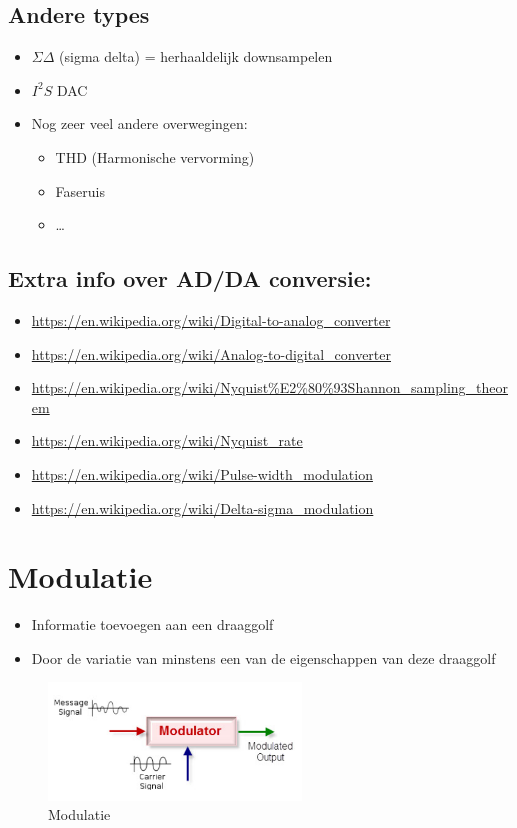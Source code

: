 \documentclass{article}
\begin{document}
\subsection{Andere types}
\begin{itemize}
    \item $\Sigma\Delta$ (sigma delta) = herhaaldelijk downsampelen
    \item $I^2S$ DAC
    \item Nog zeer veel andere overwegingen:
    \begin{itemize}
        \item THD (Harmonische vervorming)
        \item Faseruis
        \item \dots
    \end{itemize}
\end{itemize}

\subsection{Extra info over AD/DA conversie:}
\begin{itemize}
    \item \url{https://en.wikipedia.org/wiki/Digital-to-analog_converter}
    \item \url{https://en.wikipedia.org/wiki/Analog-to-digital_converter}
    \item \url{https://en.wikipedia.org/wiki/Nyquist%E2%80%93Shannon_sampling_theorem}
    \item \url{https://en.wikipedia.org/wiki/Nyquist_rate}
    \item \url{https://en.wikipedia.org/wiki/Pulse-width_modulation}
    \item \url{https://en.wikipedia.org/wiki/Delta-sigma_modulation}
\end{itemize}

\section{Modulatie}
\begin{itemize}
    \item Informatie toevoegen aan een draaggolf
    \item Door de variatie van minstens een van de eigenschappen van deze draaggolf
\end{itemize}

\begin{figure}[H]
    \centering
    \includegraphics[width=0.6\textwidth]{Screenshot_20200302_115326.png}
    \caption{Modulatie}
\end{figure}
\end{document}
